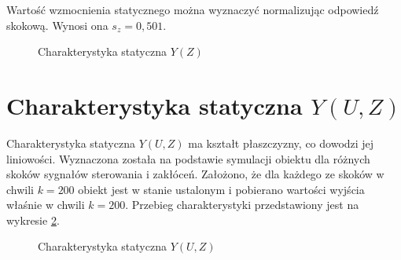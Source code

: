 Wartość wzmocnienia statycznego można wyznaczyć normalizując odpowiedź skokową. Wynosi ona $s_z=0,501$.

\begin{figure}[!htb]
	\centering
	\caption{Charakterystyka statyczna $Y(Z)$}
\label{fig:z2_y_stat_z}
\end{figure}

\section{Charakterystyka statyczna $Y(U,Z)$}
Charakterystyka statyczna $Y(U,Z)$ ma kształt płaszczyzny, co dowodzi jej liniowości. Wyznaczona została na podstawie symulacji obiektu dla różnych skoków sygnałów sterowania i zakłóceń. Założono, że dla każdego ze skoków w chwili $k=200$ obiekt jest w stanie ustalonym i pobierano wartości wyjścia właśnie w chwili $k=200$. Przebieg charakterystyki przedstawiony jest na wykresie \ref{fig:yuz}.
\begin{figure}[tb]
	\centering
	\caption{Charakterystyka statyczna $Y(U,Z)$}
	\label{fig:yuz}
\end{figure}
